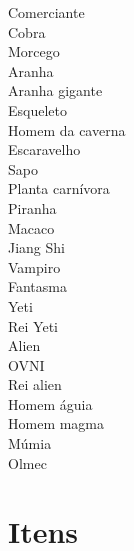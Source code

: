 \begin{description}
    \item[Comerciante]
    \item[Cobra]
    \item[Morcego]
    \item[Aranha]
    \item[Aranha gigante]
    \item[Esqueleto]
    \item[Homem da caverna]
    \item[Escaravelho]
    \item[Sapo]
    \item[Planta carnívora]
    \item[Piranha]
    \item[Macaco]
    \item[Jiang Shi]
    \item[Vampiro]
    \item[Fantasma]
    \item[Yeti]
    \item[Rei Yeti]
    \item[Alien]
    \item[OVNI]
    \item[Rei alien]
    \item[Homem águia]
    \item[Homem magma]
    \item[Múmia]
    \item[Olmec]
\end{description}

\section{\label{section:spelunky-items}Itens}

